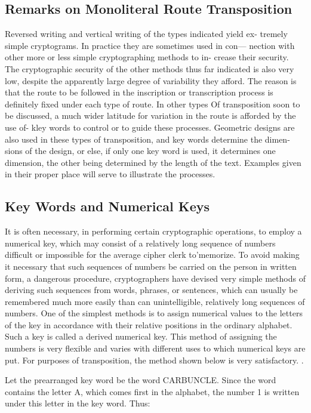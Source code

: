 \subsection{Remarks on Monoliteral Route Transposition}

Reversed writing and vertical writing of the types indicated yield ex-
tremely simple cryptograms. In practice they are sometimes used in con—
nection with other more or less simple cryptographing methods to in-
crease their security. The cryptographic security of the other methods
thus far indicated is also very low, despite the apparently large degree of
variability they afford. The reason is that the route to be followed in the
inscription or transcription process is definitely fixed under each type of
route. In other types Of transposition soon to be discussed, a much
wider latitude for variation in the route is afforded by the use of- kley
words to control or to guide these processes. Geometric designs are also
used in these types of transposition, and key words determine the dimen-
sions of the design, or else, if only one key word is used, it determines
one dimension, the other being determined by the length of the text.
Examples given in their proper place will serve to illustrate the processes.

\subsection{Key Words and Numerical Keys}

\mypara It is often necessary, in performing certain cryptographic operations, to employ a numerical key, which may consist of a relatively long
sequence of numbers difficult or impossible for the average cipher clerk
to'memorize. To avoid making it necessary that such sequences of numbers be carried on the person in written form, a dangerous procedure,
cryptographers have devised very simple methods of deriving such
sequences from words, phrases, or sentences, which can usually be remembered much more easily than can unintelligible, relatively long sequences of numbers. One of the simplest methods is to assign numerical
values to the letters of the key in accordance with their relative positions
in the ordinary alphabet. Such a key is called a derived numerical key.
This method of assigning the numbers is very ﬂexible and varies with
different uses to which numerical keys are put. For purposes of transposition, the method shown below is very satisfactory. .

\mypara Let the prearranged key word be the word CARBUNCLE. Since
the word contains the letter A, which comes first in the alphabet, the
number 1 is written under this letter in the key word. Thus:

